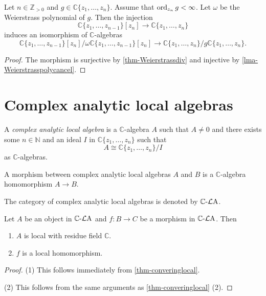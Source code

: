 \begin{corollary}
    Let $n\in \mathbb{Z}_{>0}$ and $g\in \mathbb{C}\{ z_1,\ldots,z_{n}\}$. Assume that $\operatorname{ord}_{z_n}g<\infty$. Let $\omega$ be the Weierstrass polynomial of $g$. Then the injection
    \[
        \mathbb{C}\{ z_1,\ldots,z_{n-1}\}[z_n]\rightarrow \mathbb{C}\{ z_1,\ldots,z_{n}\}
    \]
    induces an isomorphism of $\mathbb{C}$-algebras
    \[
        \mathbb{C}\{ z_1,\ldots,z_{n-1}\}[z_n]/\omega\mathbb{C}\{ z_1,\ldots,z_{n-1}\}[z_n]\rightarrow \mathbb{C}\{ z_1,\ldots,z_{n}\}/g\mathbb{C}\{ z_1,\ldots,z_{n}\}.
    \]
\end{corollary}
\begin{proof}
    The morphism is surjective by \cref{thm-Weierstrassdiv} and injective by \cref{lma-Weierstrasspolycancel}.
\end{proof}

\section{Complex analytic local algebras}

\begin{definition}\label{def-complexanalylocaalg}
    A \emph{complex analytic local algebra} is a $\mathbb{C}$-algebra $A$ such that $A\neq 0$ and there exists some $n\in \mathbb{N}$ and an ideal $I$ in $\mathbb{C}\{ z_1,\ldots,z_n \}$ such that 
    \[
        A\cong \mathbb{C}\{ z_1,\ldots,z_n \}/I
    \]
    as $\mathbb{C}$-algebras.

    A morphism between complex analytic local algebras $A$ and $B$ is a $\mathbb{C}$-algebra homomorphism $A\rightarrow B$.

    The category of complex analytic local algebras is denoted by $\mathbb{C}\text{-}\mathcal{L}\mathrm{A}$.
\end{definition}

\begin{proposition}\label{prop-converinglocalgeneral}
    Let $A$ be an object in $\mathbb{C}\text{-}\mathcal{L}\mathrm{A}$ and $f:B\rightarrow C$ be a morphism in  $\mathbb{C}\text{-}\mathcal{L}\mathrm{A}$. Then
    \begin{enumerate}
        \item $A$ is local with residue field $\mathbb{C}$.
        \item $f$ is a local homomorphism.
    \end{enumerate}
\end{proposition}
\begin{proof}
    (1) This follows immediately from \cref{thm-converinglocal}.
    
    (2) This follows from the same arguments as \cref{thm-converinglocal} (2).
\end{proof}




